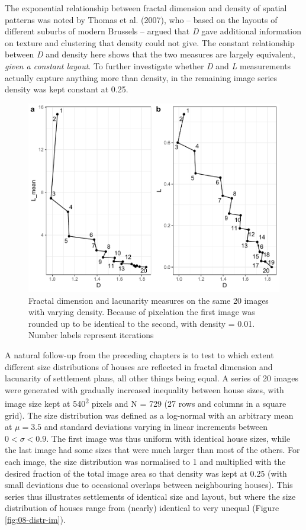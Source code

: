 \documentclass[
  12pt,
]{book}
\begin{document}
The exponential relationship between fractal dimension and density of spatial patterns was noted by Thomas et al. (2007), who -- based on the layouts of different suburbs of modern Brussels -- argued that \emph{D} gave additional information on texture and clustering that density could not give. The constant relationship between \emph{D} and density here shows that the two measures are largely equivalent, \emph{given a constant layout}. To further investigate whether \emph{D} and \emph{L} measurements actually capture anything more than density, in the remaining image series density was kept constant at 0.25.



\begin{figure}

{\centering \includegraphics[width=0.9\linewidth]{bookdown-demo_files/figure-latex/08-dens-1} 

}

\caption{Fractal dimension and lacunarity measures on the same 20 images with varying density. Because of pixelation the first image was rounded up to be identical to the second, with density = 0.01. Number labels represent iterations}\label{fig:08-dens}
\end{figure}

A natural follow-up from the preceding chapters is to test to which extent different size distributions of houses are reflected in fractal dimension and lacunarity of settlement plans, all other things being equal. A series of 20 images were generated with gradually increased inequality between house sizes, with image size kept at 540\textsuperscript{2} pixels and N = 729 (27 rows and columns in a square grid). The size distribution was defined as a log-normal with an arbitrary mean at \(\mu = 3.5\) and standard deviations varying in linear increments between \(0 < \sigma < 0.9\). The first image was thus uniform with identical house sizes, while the last image had some sizes that were much larger than most of the others. For each image, the size distribution was normalised to 1 and multiplied with the desired fraction of the total image area so that density was kept at 0.25 (with small deviations due to occasional overlaps between neighbouring houses). This series thus illustrates settlements of identical size and layout, but where the size distribution of houses range from (nearly) identical to very unequal (Figure \ref{fig:08-distr-im}).
\end{document}
